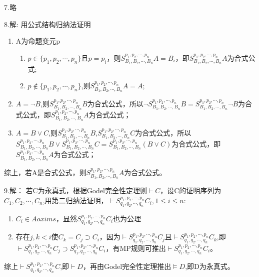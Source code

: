\documentclass[a4paper]{ctexart}
\begin{document}
\noindent 7.略

\noindent 8.解:
用公式结构归纳法证明
\begin{enumerate}
  \item A为命题变元p
  \begin{enumerate}
    \item $p\in\{p_1,p_2,\cdots,p_n\}$且$p=p_i$，则$S^{p_1,p_2,\cdots,p_n}_{B_1,B_2,\cdots,B_n}A=B_i$，即$S^{p_1,p_2,\cdots,p_n}_{B_1,B_2,\cdots,B_n}A$为合式公式;
    \item $p\not\in\{p_1,p_2,\cdots,p_n\}$,则$S^{p_1,p_2,\cdots,p_n}_{B_1,B_2,\cdots,B_n}A=A$;
  \end{enumerate}
  \item $A=\neg B$,则$S^{p_1,p_2,\cdots,p_n}_{B_1,B_2,\cdots,B_n}B$为合式公式，所以$\neg S^{p_1,p_2,\cdots,p_n}_{B_1,B_2,\cdots,B_n}B=S^{p_1,p_2,\cdots,p_n}_{B_1,B_2,\cdots,B_n}\neg B$为合式公式，即$S^{p_1,p_2,\cdots,p_n}_{B_1,B_2,\cdots,B_n}A$为合式公式；
  \item $A=B\vee C$,则$S^{p_1,p_2,\cdots,p_n}_{B_1,B_2,\cdots,B_n}B$,$S^{p_1,p_2,\cdots,p_n}_{B_1,B_2,\cdots,B_n}C$为合式公式，所以$S^{p_1,p_2,\cdots,p_n}_{B_1,B_2,\cdots,B_n}B \vee S^{p_1,p_2,\cdots,p_n}_{B_1,B_2,\cdots,B_n}C=S^{p_1,p_2,\cdots,p_n}_{B_1,B_2,\cdots,B_n}(B\vee C)$为合式公式，即$S^{p_1,p_2,\cdots,p_n}_{B_1,B_2,\cdots,B_n}A$为合式公式；
\end{enumerate}
综上，若A是合式公式，则$S^{p_1,p_2,\cdots,p_n}_{B_1,B_2,\cdots,B_n}A$为合式公式。\newline

\noindent 9.解：
若C为永真式，根据Godel完全性定理则$\vdash C$，设C的证明序列为$C_1,C_2,\cdots,C_n$,用第二归纳法证明，$\vdash S^{p_1,p_2,\cdots,p_n}_{q_1,q_2,\cdots,q_n}C_i,1\leq i\leq n$:
\begin{enumerate}
  \item $C_i\in Aoxims$，显然$S^{p_1,p_2,\cdots,p_n}_{q_1,q_2,\cdots,q_n}C_i$也为公理
  \item 存在$j,k<i$使$C_k=C_j\supset C_i$，因为$\vdash S^{p_1,p_2,\cdots,p_n}_{q_1,q_2,\cdots,q_n}C_j$且$\vdash S^{p_1,p_2,\cdots,p_n}_{q_1,q_2,\cdots,q_n}C_k$,即$\vdash S^{p_1,p_2,\cdots,p_n}_{q_1,q_2,\cdots,q_n}C_j\supset S^{p_1,p_2,\cdots,p_n}_{q_1,q_2,\cdots,q_n}C_i$，有MP规则可推出$\vdash S^{p_1,p_2,\cdots,p_n}_{q_1,q_2,\cdots,q_n}C_i$。
\end{enumerate}
综上$\vdash S^{p_1,p_2,\cdots,p_n}_{q_1,q_2,\cdots,q_n}C$,即$\vdash D$，再由Godel完全性定理推出$\models D$,即D为永真式。\newline
\end{document}
